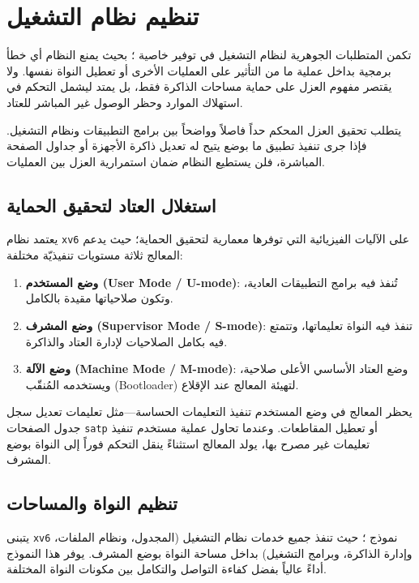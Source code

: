 \chapter{تنظيم نظام التشغيل}
\label{chap:first}

تكمن المتطلبات الجوهرية لنظام التشغيل في توفير خاصية ؛
بحيث يمنع النظام أي خطأ برمجية بداخل عملية ما من التأثير على العمليات الأخرى أو تعطيل النواة نفسها.
ولا يقتصر مفهوم العزل على حماية مساحات الذاكرة فقط، بل يمتد ليشمل التحكم في استهلاك الموارد وحظر الوصول غير المباشر للعتاد.

يتطلب تحقيق العزل المحكم حداً فاصلاً وواضحاً بين برامج التطبيقات ونظام التشغيل.
فإذا جرى تنفيذ تطبيق ما بوضع يتيح له تعديل ذاكرة الأجهزة أو جداول الصفحة المباشرة،
فلن يستطيع النظام ضمان استمرارية العزل بين العمليات.

\section{استغلال العتاد لتحقيق الحماية}

يعتمد نظام \texttt{xv6} على الآليات الفيزيائية التي توفرها معمارية  لتحقيق الحماية؛
حيث يدعم المعالج ثلاثة مستويات تنفيذيّة مختلفة:
\begin{enumerate}
\item \textbf{وضع المستخدم (User Mode / U-mode)}: تُنفذ فيه برامج التطبيقات العادية، وتكون صلاحياتها مقيدة بالكامل.
\item \textbf{وضع المشرف (Supervisor Mode / S-mode)}: تنفذ فيه النواة تعليماتها، وتتمتع فيه بكامل الصلاحيات لإدارة العتاد والذاكرة.
\item \textbf{وضع الآلة (Machine Mode / M-mode)}: وضع العتاد الأساسي الأعلى صلاحية، ويستخدمه المُنقّب (Bootloader) لتهيئة المعالج عند الإقلاع.
\end{enumerate}

يحظر المعالج في وضع المستخدم تنفيذ التعليمات الحساسة—مثل تعليمات تعديل سجل جدول الصفحات \texttt{satp} أو تعطيل المقاطعات.
وعندما تحاول عملية مستخدم تنفيذ تعليمات غير مصرح بها، يولد المعالج استثناءً ينقل التحكم فوراً إلى النواة بوضع المشرف.

\section{تنظيم النواة والمساحات}

يتبنى \texttt{xv6} نموذج ؛
حيث تنفذ جميع خدمات نظام التشغيل (المجدول، ونظام الملفات، وإدارة الذاكرة، وبرامج التشغيل) بداخل مساحة النواة بوضع المشرف.
يوفر هذا النموذج أداءً عالياً بفضل كفاءة التواصل والتكامل بين مكونات النواة المختلفة.

